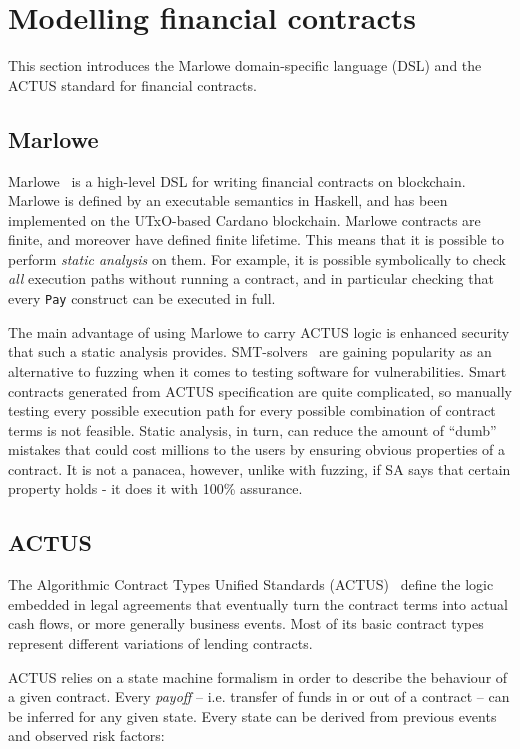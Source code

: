 \documentclass[runningheads]{llncs}
\begin{document}
\section{Modelling financial contracts}
\label{modelling}

This section introduces the Marlowe domain-specific language (DSL) and the ACTUS standard for financial contracts.

\subsection{Marlowe}

Marlowe~\cite{marlowe} is a high-level DSL for writing
financial contracts on blockchain. Marlowe is defined
by an executable semantics in Haskell, and has been implemented on
the UTxO-based Cardano blockchain. 
Marlowe contracts are finite, and moreover have defined finite lifetime. This means that it is possible to perform \emph{static analysis} on them. For example, it is possible symbolically to check \emph{all} execution paths without running a contract, and in particular checking that every \texttt{Pay} construct can be executed in full.

The main advantage of using Marlowe to carry ACTUS logic is enhanced
security that such a static analysis provides. SMT-solvers~\cite{smt} are gaining
popularity as an alternative to fuzzing when it comes to testing software
for vulnerabilities. Smart contracts generated from ACTUS
specification are quite complicated, so manually testing every possible
execution path for every possible combination of contract terms is
not feasible. Static analysis, in turn, can reduce the amount of ``dumb''
mistakes that could cost millions to the users by ensuring obvious
properties of a contract. It is not a panacea, however, unlike with
fuzzing, if SA says that certain property holds - it does it with
100\% assurance.

\subsection{ACTUS}
\label{ACTUS}

The Algorithmic Contract Types Unified Standards (ACTUS)~\cite{actus} define the logic embedded in legal agreements that eventually
turn the contract terms into actual cash flows, or more generally
business events. Most of its basic contract types represent
different variations of lending contracts.

ACTUS relies on a state machine formalism in order to describe the
behaviour of a given contract. Every \emph{payoff} -- i.e. transfer of funds in
or out of a contract -- can be inferred for any given state. Every state
can be derived from previous events and observed risk factors:
\end{document}
